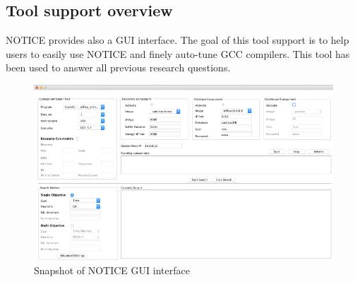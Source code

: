 		
\subsection{Tool support overview}


NOTICE provides also a GUI interface. The goal of this tool support is to help users to easily use NOTICE and finely auto-tune GCC compilers. This tool has been used to answer all previous research questions.

\begin{figure}[h]
	\center
	\includegraphics[scale=0.65]{chapitre3/fig/tool_support}
	\caption{Snapshot of NOTICE GUI interface}
	\label{fig:tool_support}
\end{figure}

